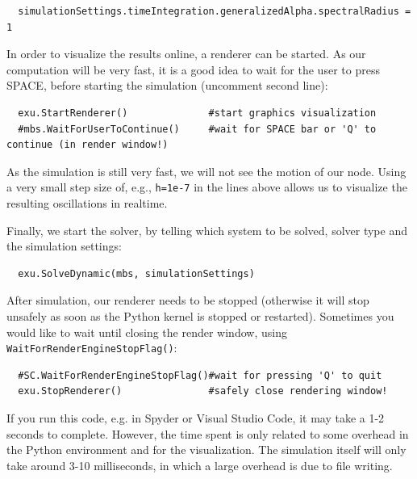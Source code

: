 \pythonstyle\begin{lstlisting}
  simulationSettings.timeIntegration.generalizedAlpha.spectralRadius = 1
\end{lstlisting}
%
In order to visualize the results online, a renderer can be started. As our computation will be very fast, it is a good idea to wait for the user to press SPACE, before starting the simulation (uncomment second line):
\pythonstyle\begin{lstlisting}
  exu.StartRenderer()              #start graphics visualization
  #mbs.WaitForUserToContinue()     #wait for SPACE bar or 'Q' to continue (in render window!)
\end{lstlisting}
As the simulation is still very fast, we will not see the motion of our node. Using a very small step size of, e.g., \texttt{h=1e-7} in the lines above allows us to visualize the resulting oscillations in realtime.

%
Finally, we start the solver, by telling which system to be solved, solver type and the simulation settings:
\pythonstyle\begin{lstlisting}
  exu.SolveDynamic(mbs, simulationSettings)
\end{lstlisting}
%

After simulation, our renderer needs to be stopped (otherwise it will stop unsafely as soon as the Python kernel is stopped or restarted). 
Sometimes you would like to wait until closing the render window, using \texttt{WaitForRenderEngineStopFlag()}:
\pythonstyle\begin{lstlisting}
  #SC.WaitForRenderEngineStopFlag()#wait for pressing 'Q' to quit
  exu.StopRenderer()               #safely close rendering window!
\end{lstlisting}
%
If you run this code, e.g. in Spyder or Visual Studio Code, it may take a 1-2 seconds to complete. However, the time spent is only related to some overhead in the Python environment and for the visualization. The simulation itself will only take around 3-10 milliseconds, in which a large overhead is due to file writing.

